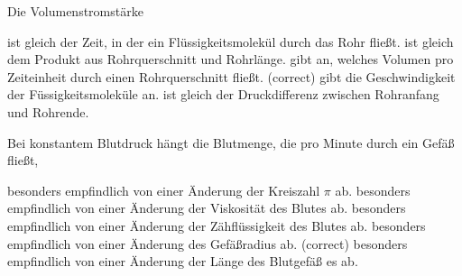 \documentclass[11pt]{exam}
\begin{document}
\begin{questions}
\vspace{3mm}\question Die Volumenstromstärke

\begin{choices}
	\choice ist gleich der Zeit, in der ein Flüssigkeitsmolekül durch das Rohr fließt.
	\choice ist gleich dem Produkt aus Rohrquerschnitt und Rohrlänge.
	\choice gibt an, welches Volumen pro Zeiteinheit durch einen Rohrquerschnitt fließt. (correct)
	\choice gibt die Geschwindigkeit der Füssigkeitsmoleküle an.
	\choice ist gleich der Druckdifferenz zwischen Rohranfang und Rohrende.
\end{choices}

\vspace{3mm}\question Bei konstantem Blutdruck hängt die Blutmenge, die pro Minute durch ein Gefäß fließt,

\begin{choices}
	\choice besonders empfindlich von einer Änderung der Kreiszahl \(\pi\) ab.
	\choice besonders empfindlich von einer Änderung der Viskosität des Blutes ab.
	\choice besonders empfindlich von einer Änderung der Zähflüssigkeit des Blutes ab.
	\choice besonders empfindlich von einer Änderung des Gefäßradius ab. (correct)
	\choice besonders empfindlich von einer Änderung der Länge des Blutgefäß es ab.
\end{choices}

\vspace{3mm}\end{questions}
\end{document}
